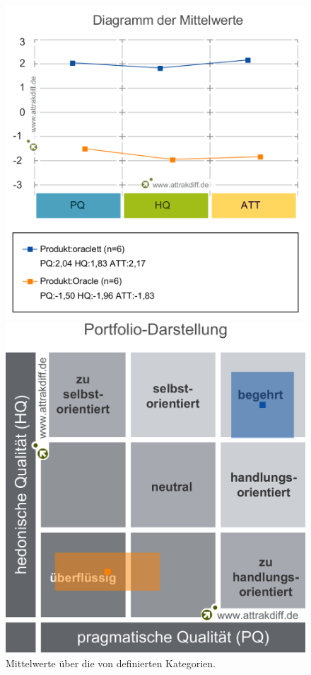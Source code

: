 \documentclass[oneside,bibliography=totocnumbered,BCOR=5mm]{scrbook}
\begin{document}
\begin{figure}[H]
  \centering
  \begin{minipage}[b]{0.4\textwidth}
    \centering
    \includegraphics[scale=0.28]{attrak-mittelwerte.png}
    \caption{Mittelwerte über die von \textcite{attrakdiff} definierten Kategorien.}
    \label{fig:attrak-mittelwerte}
  \end{minipage}
  \hfill
  \begin{minipage}[b]{0.4\textwidth}
    \centering
    \includegraphics[scale=0.26]{attrak-portfolio.png}

\end{minipage}
\end{figure}
\end{document}
